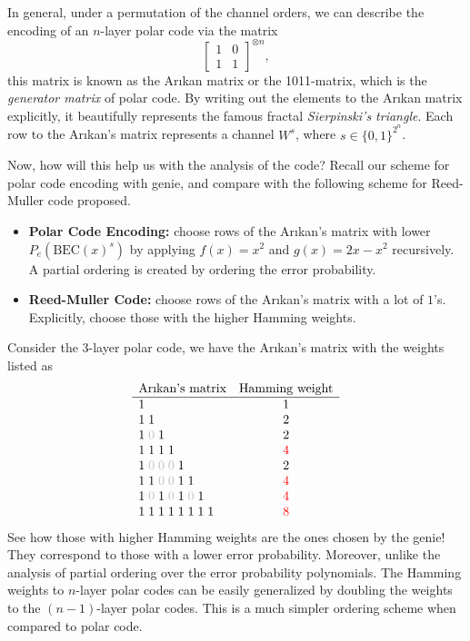 In general, under a permutation of the channel orders, we can describe the encoding of an $n$-layer polar code via the matrix
\begin{equation}
    \left[\begin{matrix}
        1 & 0 \\ 1 & 1
    \end{matrix}\right]^{\otimes n},
\end{equation}
this matrix is known as the Ar{\i}kan matrix or the 1011-matrix, which is the \textit{generator matrix} of polar code. By writing out the elements to the Ar{\i}kan matrix explicitly, it beautifully represents the famous fractal \textit{Sierpinski's triangle}. Each row to the Ar{\i}kan's matrix represents a channel $W^s$, where $s\in\{0,1\}^{2^n}$.

Now, how will this help us with the analysis of the code? Recall our scheme for polar code encoding with genie, and compare with the following scheme for Reed-Muller code proposed.
\begin{itemize}
    \item \textbf{Polar Code Encoding:} choose rows of the Ar{\i}kan's matrix with lower $P_e(\mathrm{BEC}(x)^s)$ by applying $f(x)=x^2$ and $g(x)=2x-x^2$ recursively. A partial ordering is created by ordering the error probability.
    \item \textbf{Reed-Muller Code:} choose rows of the Ar{\i}kan's matrix with a lot of $1$'s. Explicitly, choose those with the higher Hamming weights.
\end{itemize}
\begin{example}
    Consider the 3-layer polar code, we have the Ar{\i}kan's matrix with the weights listed as
    \begin{equation*}
        \begin{array}{lc}
            \text{Ar{\i}kan's matrix} & \text{Hamming weight} \\\hline
            1 & 1 \\
            1\;1 & 2 \\
            1\;{\color{lightgray}0}\;1 & 2 \\
            1\;1\;1\;1 & \color{red}4 \\
            1\;{\color{lightgray}0\;0\;0}\;1 & 2 \\
            1\;1\;{\color{lightgray}0\;0}\;1\;1 & \color{red}4 \\
            1\;{\color{lightgray}0}\;1\;{\color{lightgray}0}\;1\;{\color{lightgray}0}\;1 & \color{red}4 \\
            1\;1\;1\;1\;1\;1\;1\;1 & \color{red}8
        \end{array}
    \end{equation*}
    See how those with higher Hamming weights are the ones chosen by the genie! They correspond to those with a lower error probability. Moreover, unlike the analysis of partial ordering over the error probability polynomials. The Hamming weights to $n$-layer polar codes can be easily generalized by doubling the weights to the $(n-1)$-layer polar codes. This is a much simpler ordering scheme when compared to polar code.
\end{example}

